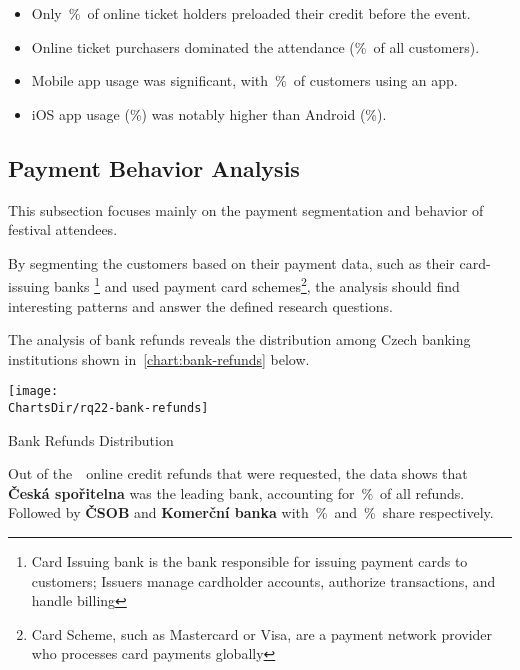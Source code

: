 \begin{keytakeaways}
	\begin{itemize}
		\item Only~\%~of online ticket holders preloaded their credit before the event.
		\item Online ticket purchasers dominated the attendance (\%~of all customers).
		\item Mobile app usage was significant, with~\%~of customers using an app.
		\item iOS app usage (\%) was notably higher than Android (\%).
	\end{itemize}
\end{keytakeaways}



\subsection{Payment Behavior Analysis}
\label{subsec:analysis-customer-payment-behavior}
This subsection focuses mainly on the payment segmentation and behavior of festival attendees.

By segmenting the customers based on their payment data,
such as their card-issuing banks
\footnote{Card Issuing bank is the bank responsible for issuing payment cards to customers; Issuers manage cardholder accounts, authorize transactions, and handle billing\cite{jc_what_are_card_schemes_and_how_do_they_work}} and used
payment card schemes\footnote{Card Scheme, such as Mastercard or Visa, are a payment network provider who processes card payments globally\cite{jc_what_are_card_schemes_and_how_do_they_work}}, the analysis should find interesting
patterns and answer the defined research questions.


The analysis of bank refunds reveals the distribution among Czech banking institutions shown in~\autoref{chart:bank-refunds} below.

\begin{chart}[h]
	\centering
	\texttt{[image: \\ChartsDir/rq22-bank-refunds]}
	\caption{ Bank Refunds Distribution}
	\label{chart:bank-refunds}
	\source
\end{chart}

Out of the~~online credit refunds that were requested, the data shows that \textbf{Česká spořitelna} was the leading bank, accounting for~\%~of all refunds.
Followed by \textbf{ČSOB} and \textbf{Komerční banka} with~\%~and~\%~share respectively.

